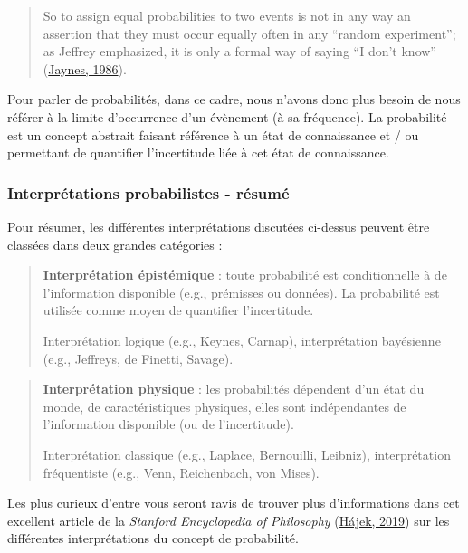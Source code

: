\documentclass[
  a4paper,11pt,twoside,onecolumn,openright,final,oldfontcommands]{memoir}
\theoremstyle{definition}
\theoremstyle{definition}
\theoremstyle{definition}
\theoremstyle{definition}
\theoremstyle{remark}
\begin{document}
\begin{quote}
So to assign equal probabilities to two events is not in any way an assertion that they must occur equally often in any ``random experiment''; as Jeffrey emphasized, it is only a formal way of saying ``I don't know'' (\protect\hyperlink{ref-jaynes_bayesian_1986}{Jaynes, 1986}).
\end{quote}

Pour parler de probabilités, dans ce cadre, nous n'avons donc plus besoin de nous référer à la limite d'occurrence d'un évènement (à sa fréquence). La probabilité est un concept abstrait faisant référence à un état de connaissance et / ou permettant de quantifier l'incertitude liée à cet état de connaissance.

\hypertarget{interpruxe9tations-probabilistes---ruxe9sumuxe9}{%
\subsubsection{Interprétations probabilistes - résumé}\label{interpruxe9tations-probabilistes---ruxe9sumuxe9}}

Pour résumer, les différentes interprétations discutées ci-dessus peuvent être classées dans deux grandes catégories :

\begin{quote}
\textbf{Interprétation épistémique} : toute probabilité est conditionnelle à de l'information disponible (e.g., prémisses ou données). La probabilité est utilisée comme moyen de quantifier l'incertitude.

Interprétation logique (e.g., Keynes, Carnap), interprétation bayésienne (e.g., Jeffreys, de Finetti, Savage).
\end{quote}

\begin{quote}
\textbf{Interprétation physique} : les probabilités dépendent d'un état du monde, de caractéristiques physiques, elles sont indépendantes de l'information disponible (ou de l'incertitude).

Interprétation classique (e.g., Laplace, Bernouilli, Leibniz), interprétation fréquentiste (e.g., Venn, Reichenbach, von Mises).
\end{quote}

Les plus curieux d'entre vous seront ravis de trouver plus d'informations dans cet excellent article de la \emph{Stanford Encyclopedia of Philosophy} (\protect\hyperlink{ref-sep-probability-interpret}{Hájek, 2019}) sur les différentes interprétations du concept de probabilité.
\end{document}
